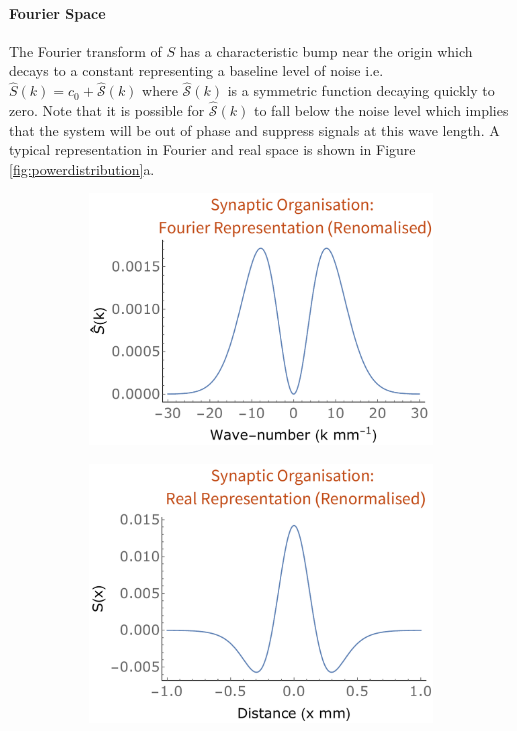 \paragraph{Fourier Space}
{  The Fourier transform of $S$ has a characteristic bump near the origin which decays to a constant representing a baseline level of noise  i.e. $\hat{S}(k) = c_0 + \hat{\mathcal{S}}(k)$ where $\hat{\mathcal{S}}(k)$ is a symmetric function decaying quickly to zero.} Note that it is possible for $\hat{\mathcal{S}}(k)$ to fall below the noise level which implies that the system will be out of phase and suppress signals at this wave length. A typical representation in Fourier and real space is shown in Figure \ref{fig:powerdistribution}a. 
\begin{figure}
	\centering
	\begin{subfigure}{0.4\textwidth}
		\centering
		\includegraphics[width=\textwidth]{images/nft_activity/example-typicaldistributionfourier}
		\caption{}
	\end{subfigure}
	\begin{subfigure}{0.4\textwidth}
		\centering
		\includegraphics[width=\textwidth]{images/nft_activity/example-typicaldistributionreal}

\end{subfigure}
\end{figure}
